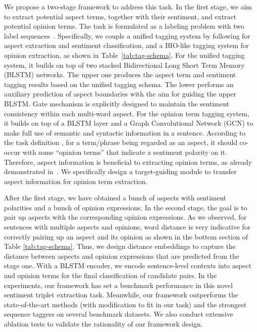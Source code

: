 \documentclass[letterpaper]{article} \usepackage{aaai20}  \usepackage{times}  \usepackage{helvet} \usepackage{courier}  \usepackage[hyphens]{url}  \usepackage{graphicx} \urlstyle{rm} \def\UrlFont{\rm}  \usepackage{graphicx}  \frenchspacing  \setlength{\pdfpagewidth}{8.5in}  \setlength{\pdfpageheight}{11in}
\begin{document}
We propose a two-stage framework to address this task. In the first stage, we aim to extract potential aspect terms, together with their sentiment, and extract potential opinion terms. 
The task is formulated as a labeling problem with two label sequences~\cite{D13-1171,wang2017coupled}. Specifically, we couple a unified tagging system by following \cite{li2019unified} for aspect extraction and sentiment classification, and a BIO-like tagging system for opinion extraction, as shown in Table~\ref{tab:tag-schema}. For the unified tagging system, it builds on top of two stacked Bidirectional Long Short Term Memory (BLSTM) networks. The upper one produces the aspect term and sentiment tagging results based on the unified tagging schema. The lower performs an auxiliary prediction of aspect boundaries with the aim for guiding the upper BLSTM. Gate mechanism is explicitly designed to maintain the sentiment consistency within each multi-word aspect. For the opinion term tagging system, it builds on top of a BLSTM layer and a Graph Convolutional Network (GCN) to make full use of semantic and syntactic information in a sentence.
According to the task definition \cite{S14-2004,S15-2082,S16-1002,li2018aspect,li2019unified}, for a term/phrase being regarded as an aspect, it should co-occur with some ``opinion terms'' that indicate a sentiment polarity on it. 
Therefore, aspect information is beneficial to extracting opinion terms, as already demonstrated in~\cite{zhang2017semi,wang2017coupled,dai2019neural}. 
We specifically design a target-guiding module to transfer aspect information for opinion term extraction. 

After the first stage, we have obtained a bunch of aspects with sentiment polarities and a bunch of opinion expressions. In the second stage, the goal is to pair up aspects with the corresponding opinion expressions. As we observed, for sentences with multiple aspects and opinions, word distance is very indicative for correctly pairing up an aspect and its opinion as shown in the bottom section of Table \ref{tab:tag-schema}. 
Thus, we design distance embeddings to capture the distance between aspects and opinion expressions that are predicted from the stage one. 
With a BLSTM encoder, we encode sentence-level contexts into aspect and opinion terms for the final classification of candidate pairs.
In the experiments, our framework has set a benchmark performance in this novel sentiment triplet extraction task. Meanwhile, our framework outperforms the state-of-the-art methods (with modification to fit in our task) and the strongest sequence taggers on several benchmark datasets. We also conduct extensive ablation tests to validate the rationality of our framework design.
\end{document}
